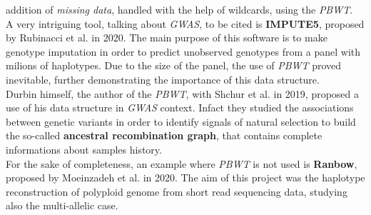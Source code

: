 \documentclass[a4paper,11pt, oneside]{article}
\begin{document}
addition of \textit{missing data}, handled with the help of wildcards, using the
\textit{PBWT}. \\ 
A very intriguing tool, talking about \textit{GWAS}, to be cited is
\textbf{IMPUTE5}, proposed by Rubinacci et al. in 2020. The main purpose of this
software is to make genotype imputation in order to predict unobserved genotypes
from a panel with milions of haplotypes. Due to the size of the panel, the use
of \textit{PBWT} proved inevitable, further demonstrating the importance of this
data structure.\\
Durbin himself, the author of the \textit{PBWT}, with Shchur et al. in 2019,
proposed a use of his data structure in \textit{GWAS} context. Infact they
studied the associations between genetic variants in order to identify signals
of natural selection to build the so-called \textbf{ancestral recombination
  graph}, that contains complete informations about samples history.\\
For the sake of completeness, an example where \textit{PBWT} is not used is
\textbf{Ranbow}, proposed by Moeinzadeh et al. in 2020. The 
aim of this project was the haplotype reconstruction of polyploid genome from
short read sequencing data, studying also the multi-allelic case.
\end{document}
